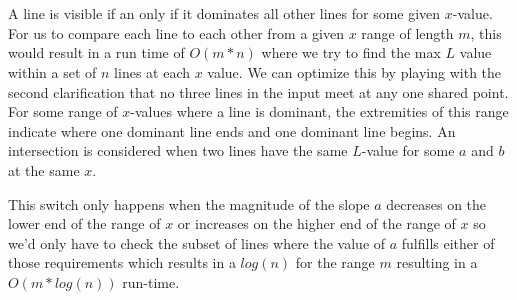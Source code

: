 \documentclass[12pt]{article}
\begin{document}
\section{}
A line is visible if an only if it dominates all other lines for some given $x$-value. For us to compare each line to each other from a given $x$ range of length $m$, this would result in a run time of $O(m*n)$ where we try to find the max $L$ value within a set of $n$ lines at each $x$ value. We can optimize this by playing with the second clarification that no three lines in the input meet at any one shared point. For some range of $x$-values where a line is dominant, the extremities of this range indicate where one dominant line ends and one dominant line begins. An intersection is considered when two lines have the same $L$-value for some $a$ and $b$ at the same $x$.\newline

\noindent This switch only happens when the magnitude of the slope $a$ decreases on the lower end of the range of $x$ or increases on the higher end of the range of $x$ so we'd only have to check the subset of lines where the value of $a$ fulfills either of those requirements which results in a $log(n)$ for the range $m$ resulting in a $O(m*log(n))$ run-time.
\end{document}
